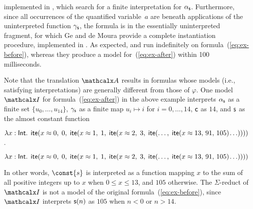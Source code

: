 \begin{example}
implemented in \cvc, which search for a finite interpretation for $\alpha_{\mathsf{s}}$. 
Furthermore, since all occurrences of the quantified variable~$a$ are 
beneath applications of the uninterpreted function $\gamma_{\mathsf{s}}$, 
the formula is in the essentially uninterpreted fragment,
for which Ge and de Moura \cite{GeDeM-CAV-09} provide 
a complete instantiation procedure, implemented in \ziii. 
As expected,
\cvc and \ziii run indefinitely on formula~(\ref{eq:ex-before}), 
whereas they produce a model for~(\ref{eq:ex-after}) 
within 100 milliseconds.\xend
\end{example}

\newcommand\badlambda{\lambda x : \typeint.\allowbreak\;\, \lite( x \teq 0,\allowbreak\; 0,\allowbreak\;
  \lite( x \teq 1,\allowbreak\; 1,\allowbreak\;
    \lite( x \teq 2,\allowbreak\; 3,\allowbreak\;
      \lite(\ldots,\allowbreak\; \lite( x \teq 13,\allowbreak\, 91,\allowbreak\, 105 )\negvthinspace \ldots ))))}

Note that the translation $\conv$ results in formulas whose models
(i.e., satisfying interpretations) are generally different from those of $\varphi$.
One model $\I$ for formula~(\ref{eq:ex-after}) in the above example interprets
$\alpha_{\mathsf{s}}$ as a finite set $\{ u_0, \ldots, u_{14} \}$,
$\gamma_{\mathsf{s}}$ as a finite map $u_i \mapsto i$ for $i = 0, \ldots, 14$,
$\mathsf{c}$ as $14$,
and $\mathsf{s}$ as the almost constant function
%
\begin{conf}$\badlambda$. \end{conf}%
\begin{rep}\[\badlambda\]\end{rep}%
%
In other words, $\const{s}$ is interpreted as a function mapping $x$ to the sum
of all positive integers up to $x$ when $0 \leq x \leq 13$, and $105$
otherwise.
The $\Sigma$-reduct of $\I$ is not a model of the original formula~(\ref{eq:ex-before}),
since $\I$ 
interprets $\mathsf{s}( n )$ as $105$ when $n < 0$ or $n > 14$.

